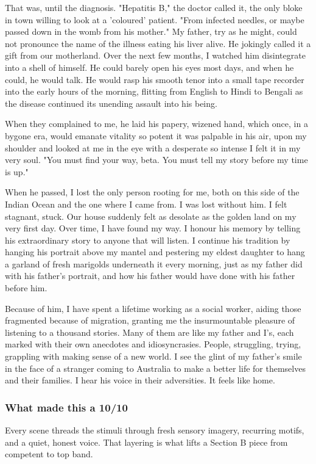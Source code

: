 \documentclass[a4paper]{article}
\begin{document}
That was, until the diagnosis. "Hepatitis B," the doctor called it, the only bloke in town willing to look at a 'coloured' patient. "From infected needles, or maybe passed down in the womb from his mother." My father, try as he might, could not pronounce the name of the illness eating his liver alive. He jokingly called it a gift from our motherland. Over the next few months, I watched him disintegrate into a shell of himself. He could barely open his eyes most days, and when he could, he would talk. He would rasp his smooth tenor into a small tape recorder into the early hours of the morning, flitting from English to Hindi to Bengali as the disease continued its unending assault into his being.

When they complained to me, he laid his papery, wizened hand, which once, in a bygone era, would emanate vitality so potent it was palpable in his air, upon my shoulder and looked at me in the eye with a desperate so intense I felt it in my very soul. "You must find your way, beta. You must tell my story before my time is up."

When he passed, I lost the only person rooting for me, both on this side of the Indian Ocean and the one where I came from. I was lost without him. I felt stagnant, stuck. Our house suddenly felt as desolate as the golden land on my very first day. Over time, I have found my way. I honour his memory by telling his extraordinary story to anyone that will listen. I continue his tradition by hanging his portrait above my mantel and pestering my eldest daughter to hang a garland of fresh marigolds underneath it every morning, just as my father did with his father's portrait, and how his father would have done with his father before him.

Because of him, I have spent a lifetime working as a social worker, aiding those fragmented because of migration, granting me the insurmountable pleasure of listening to a thousand stories. Many of them are like my father and I's, each marked with their own anecdotes and idiosyncrasies. People, struggling, trying, grappling with making sense of a new world. I see the glint of my father's smile in the face of a stranger coming to Australia to make a better life for themselves and their families. I hear his voice in their adversities. It feels like home.

\subsubsection{What made this a 10/10}
Every scene threads the stimuli through fresh sensory imagery, recurring motifs, and a quiet, honest voice. That layering is what lifts a Section B piece from competent to top band.
\end{document}
